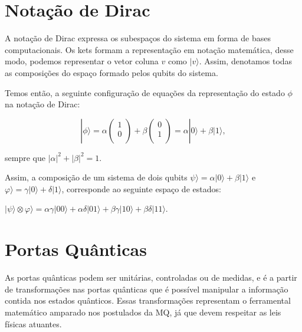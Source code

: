 \documentclass[tcc,capa]{texufpel}
\begin{document}
\section{Notação de Dirac}

A notação de Dirac expressa os subespaços do sistema em forma de bases computacionais. Os kets formam a representação em notação matemática, desse modo, podemos representar o vetor coluna $v$ como $|v\rangle$. Assim, denotamos todas as composições do espaço formado pelos qubits do sistema\cite{imre2005quantum}.

Temos então, a seguinte configuração de equações da representação do estado $\phi$ na notação de Dirac: 
\begin{center}
\begin{equation*}
    |\phi\rangle= \alpha \left(
         \begin{array}{c}
           1 \\
           0 \\
         \end{array}
       \right)
       + \beta \left(
         \begin{array}{c}
           0 \\
           1 \\
         \end{array}
       \right)
       =\alpha|0\rangle+\beta|1\rangle,
\end{equation*}
    
\end{center}

sempre que $|\alpha|^2+|\beta|^2=1$.

Assim, a composição de um sistema de dois qubits $\psi\rangle=\alpha|0\rangle+\beta|1\rangle$ e $\varphi\rangle=\gamma|0\rangle+\delta|1\rangle$, corresponde ao seguinte espaço de estados\cite{chuang00a}:

$|\psi\rangle \otimes \varphi\rangle= \alpha\gamma|00\rangle + \alpha\delta|01\rangle + \beta\gamma|10\rangle + \beta\delta|11\rangle$. 

\section{Portas Quânticas}
As portas quânticas podem ser unitárias, controladas ou de medidas, e é a partir de transformações nas portas quânticas que é possível manipular a informação contida nos estados quânticos. Essas transformações representam o ferramental matemático amparado nos postulados da MQ, já que devem respeitar as leis físicas atuantes.
\end{document}
